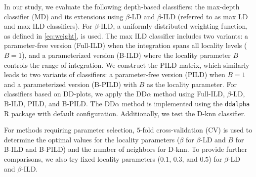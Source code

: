 \documentclass[final,3p,times]{elsarticle}
\begin{document}
In our study, we evaluate the following depth-based classifiers: the max-depth classifier (MD) and its extensions using $\beta$-LD and $\beta$-ILD (referred to as max LD and max ILD classifiers). For $\beta$-ILD, a uniformly distributed weighting function, as defined in \eqref{eq:weight}, is used. The max ILD classifier includes two variants: a parameter-free version (Full-ILD) when the integration spans all locality levels ($B=1$), and a parameterized version (B-ILD) where the locality parameter $B$ controls the range of integration. We construct the PILD matrix, which similarly leads to two variants of classifiers: a parameter-free version (PILD) when $B=1$ and a parameterized version (B-PILD) with $B$ as the locality parameter. For classifiers based on DD-plots, we apply the DD$\alpha$ method using Full-ILD, $\beta$-LD, B-ILD, PILD, and B-PILD. The DD$\alpha$ method is implemented using the \texttt{ddalpha} R package \cite{pokotylo2016depth} with default configuration. Additionally, we test the D-knn classifier.

For methods requiring parameter selection, $5$-fold cross-validation (CV) is used to determine the optimal values for the locality parameters ($\beta$ for $\beta$-LD and $B$ for B-ILD and B-PILD) and the number of neighbors for D-knn. To provide further comparisons, we also try fixed locality parameters ($0.1$, $0.3$, and $0.5$) for $\beta$-LD and $\beta$-ILD.
\end{document}
